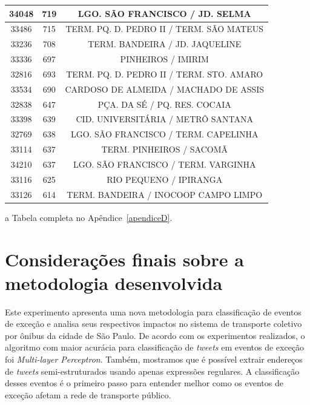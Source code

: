 \documentclass[
	12pt,				%
	oneside,			%
	a4paper,			%
	english,			%
	brazil				%
	]{abntex2ppgsi}
\begin{document}
{{{\begin {table} [!htb]
{\begin{threeparttable}
\begin {tabular} {c|c|c}
    34048 & 719   & LGO. SÃO FRANCISCO / JD. SELMA  \\
\hline

    33486 & 715   & TERM. PQ. D. PEDRO II / TERM. SÃO MATEUS  \\
\hline

    33236 & 708   & TERM. BANDEIRA / JD. JAQUELINE  \\
\hline

    33336 & 697   & PINHEIROS / IMIRIM  \\
\hline

    32816 & 693   & TERM. PQ. D. PEDRO II / TERM. STO. AMARO  \\
\hline

    33534 & 690   & CARDOSO DE ALMEIDA / MACHADO DE ASSIS  \\
\hline

    32838 & 647   & PÇA. DA SÉ / PQ. RES. COCAIA  \\
\hline

    33398 & 639   & CID. UNIVERSITÁRIA / METRÔ SANTANA  \\
\hline

    32769 & 638   & LGO. SÃO FRANCISCO / TERM. CAPELINHA  \\
\hline

    33114 & 637   & TERM. PINHEIROS / SACOMÃ  \\
\hline

    34210 & 637   & LGO. SÃO FRANCISCO / TERM. VARGINHA  \\
\hline

    33116 & 625   & RIO PEQUENO / IPIRANGA  \\
\hline

    33126 & 614   & TERM. BANDEIRA / INOCOOP CAMPO LIMPO  \\
\bottomrule
\end{tabular}
\begin{tablenotes}
            \item[a] Tabela completa no Apêndice~\ref{apendiceD}.
        \end{tablenotes}
\end{threeparttable}
}
\end{table}

\section{Considerações finais sobre a metodologia desenvolvida}

Este experimento apresenta uma nova metodologia para classificação de eventos de exceção e analisa seus respectivos impactos no sistema de transporte coletivo por ônibus da cidade de São Paulo. De acordo com os experimentos realizados, o algoritmo com maior  acurácia para classificação de \textit{tweets} em eventos de exceção foi \textit{Multi-layer Perceptron}. Também, mostramos que é possível extrair endereços de \textit{tweets} semi-estruturados usando apenas expressões regulares. A classificação desses eventos é o primeiro passo para entender melhor como os eventos de exceção afetam a rede de transporte público.

}}}
\end{document}
